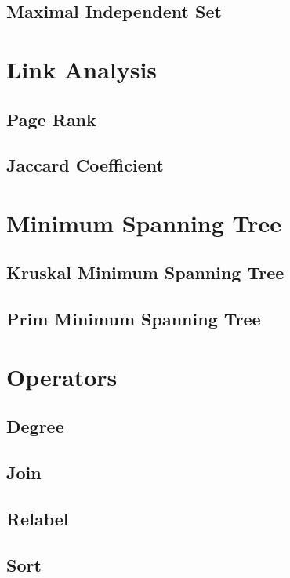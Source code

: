 \subsection{Maximal Independent Set}


\section{Link Analysis}
\subsection{Page Rank}

\subsection{Jaccard Coefficient}


\section{Minimum Spanning Tree}

\subsection{Kruskal Minimum Spanning Tree}

\subsection{Prim Minimum Spanning Tree}

\section{Operators}
\subsection{Degree}

\subsection{Join}

\subsection{Relabel}

\subsection{Sort}

